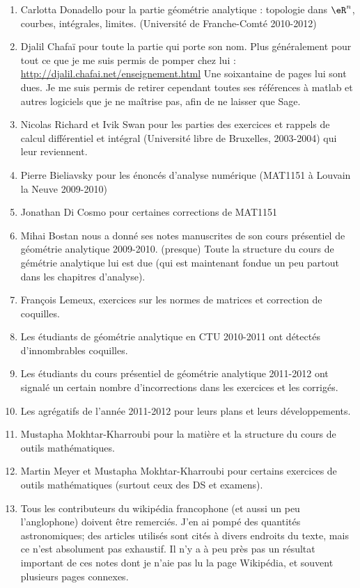 \begin{enumerate}
    \item Carlotta Donadello pour la partie géométrie analytique : topologie dans \( \eR^n\), courbes, intégrales, limites. (Université de Franche-Comté 2010-2012)
    \item Djalil Chafaï pour toute la partie qui porte son nom. Plus généralement pour tout ce que je me suis permis de pomper chez lui :\\ \href{http://djalil.chafai.net/enseignement.html}{http://djalil.chafai.net/enseignement.html} Une soixantaine de pages lui sont dues. Je me suis permis de retirer cependant toutes ses références à matlab et autres logiciels que je ne maîtrise pas, afin de ne laisser que Sage.
    \item Nicolas Richard et Ivik Swan pour les parties des exercices et rappels de calcul différentiel et intégral (Université libre de Bruxelles, 2003-2004) qui leur reviennent.
    \item Pierre Bieliavsky pour les énoncés d'analyse numérique (MAT1151 à Louvain la Neuve 2009-2010)
    \item Jonathan Di Cosmo pour certaines corrections de MAT1151
    \item
        Mihai Bostan nous a donné ses notes manuscrites de son cours présentiel de géométrie analytique 2009-2010. (presque) Toute la structure du cours de gémétrie analytique lui est due (qui est maintenant fondue un peu partout dans les chapitres d'analyse).
    \item
        François Lemeux, exercices sur les normes de matrices et correction de coquilles.
    \item
        Les étudiants de géométrie analytique en CTU 2010-2011 ont détectés d'innombrables coquilles.
    \item
        Les étudiants du cours présentiel de géométrie analytique 2011-2012 ont signalé un certain nombre d'incorrections dans les exercices et les corrigés.
    \item
        Les agrégatifs de l'année 2011-2012 pour leurs plans et leurs développements.
    \item
        Mustapha Mokhtar-Kharroubi pour la matière et la structure du cours de outils mathématiques.
    \item
        Martin Meyer et Mustapha Mokhtar-Kharroubi pour certains exercices de outils mathématiques (surtout ceux des DS et examens).
    \item
        Tous les contributeurs du wikipédia francophone (et aussi un peu l'anglophone) doivent être remerciés. J'en ai pompé des quantités astronomiques; des articles utilisés sont cités à divers endroits du texte, mais ce n'est absolument pas exhaustif. Il n'y a à peu près pas un résultat important de ces notes dont je n'aie pas lu la page Wikipédia, et souvent plusieurs pages connexes.

\end{enumerate}
